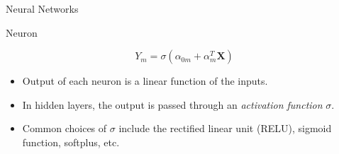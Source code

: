 \documentclass[aspectratio=169]{beamer}
\let \vec \mathbf
\begin{document}
\begin{frame}{Neural Networks}
    
\end{frame}


\begin{frame}{Neuron}
\begin{figure}
\end{figure}
\begin{equation*}
    Y_m = \sigma(\alpha_{0m} + \alpha_{m}^T \vec{X})
\end{equation*}
    \begin{itemize}
        \item Output of each neuron is a linear function of the inputs.
        \item In hidden layers, the output is passed through an \textit{activation function} $\sigma$.
        \item Common choices of $\sigma$ include the rectified linear unit (RELU), sigmoid function, softplus, etc.
    \end{itemize}
\end{frame}
\end{document}
